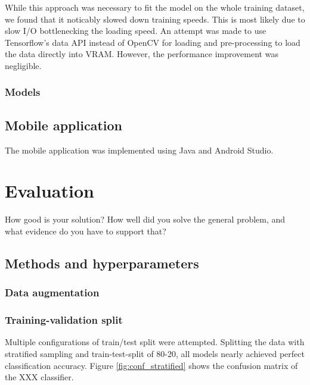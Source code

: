 \documentclass{l4proj}
\begin{document}
While this approach was necessary to fit the model on the whole training dataset, we found that it noticably slowed down training speeds. This is most likely due to slow I/O bottlenecking the loading speed. An attempt was made to use Tensorflow's data API instead of OpenCV for loading and pre-processing to load the data directly into VRAM. However, the performance improvement was negligible.

\subsection{Models}



\section{Mobile application}

The mobile application was implemented using Java and Android Studio. 




\chapter{Evaluation} 
How good is your solution? How well did you solve the general problem, and what evidence do you have to support that?

\section{Methods and hyperparameters}

\subsection{Data augmentation}

\subsection{Training-validation split}
\label{eval_train_val_split}

Multiple configurations of train/test split were attempted. Splitting the data with stratified sampling and train-test-split of 80-20, all models nearly achieved perfect classification accuracy. Figure \ref{fig:conf_stratified} shows the confusion matrix of the XXX classifier.  
\end{document}
